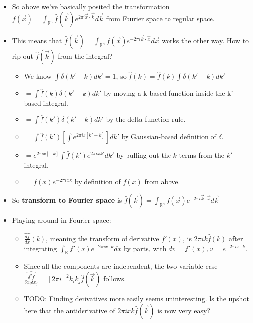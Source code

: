 \documentclass[11pt, oneside]{article}   	%
\begin{document}
\begin{itemize}
\item So above we've basically posited the transformation $f(\vec{x}) = \int_{\mathbb{R}^n}\hat{f}(\vec{k})e^{2 \pi i \vec{x} \cdot \vec{k}} d\vec{k}$ from Fourier space to regular space.
\item This means that $\hat{f}(\vec{k}) = \int_{\mathbb{R}^n}f(\vec{x})e^{-2 \pi i \vec{k} \cdot \vec{x}} d\vec{x}$ works the other way.  How to rip out $\hat{f}(\vec{k})$ from the integral?

\begin{itemize}
\item We know $\int \delta(k' - k) dk' = 1$, so $\hat{f}(k) = \hat{f}(k) \int \delta(k' - k) dk'$
\item $=  \int \hat{f}(k) \delta(k' - k) dk'$ by moving a k-based function inside the k'-based integral.
\item $ =  \int \hat{f}(k') \delta(k' - k) dk'$ by the delta function rule.
\item $= \int \hat{f}(k') [\int e^{2\pi i x [k'-k]} ]dk'$ by Gaussian-based definition of $\delta$.
\item $= e^{2\pi i x [-k]} \int \hat{f}(k') e^{2\pi i x k'}  dk'$ by pulling out the $k$ terms from the $k'$ integral.
\item $= f(x) e^{-2\pi i x k}$ by definition of $f(x)$ from above.
\end{itemize}

\item So \textbf{transform to Fourier space} is $\hat{f}(\vec{k}) = \int_{\mathbb{R}^n}f(\vec{x})e^{-2\pi i \vec{k}\cdot \vec{x}} d\vec{k}$
\item Playing around in Fourier space:
\begin{itemize}
\item $\hat{\frac{df}{dx}}(k)$, meaning the transform of derivative $f'(x)$, is $2\pi i k \hat{f}(k)$ after integrating $\int_{\mathbb{R}} f'(x)e^{-2\pi i x \cdot k}dx$ by parts, with $dv = f'(x), u = e^{-2\pi i x \cdot k}$. 
\item Since all the components are independent, the two-variable case $\hat{\frac{\delta^2 f}{\delta x_i \delta x_j}} = [2\pi i]^2 k_ik_j \hat{f}(\vec{k})$ follows.
\item TODO: Finding derivatives more easily seems uninteresting.  Is the upshot here that the antiderivative of $2\pi i x k\hat{f}(\vec{k})$ is now very easy?
\end{itemize}
\end{itemize}
\end{document}
